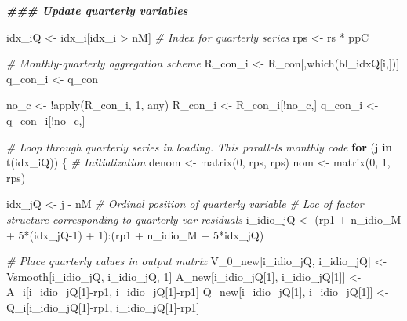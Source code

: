 \documentclass[
]{article}
\newenvironment{Shaded}{\begin{snugshade}}{\end{snugshade}}
\newcommand{\CommentTok}[1]{\textcolor[rgb]{0.56,0.35,0.01}{\textit{#1}}}
\newcommand{\ControlFlowTok}[1]{\textcolor[rgb]{0.13,0.29,0.53}{\textbf{#1}}}
\newcommand{\DecValTok}[1]{\textcolor[rgb]{0.00,0.00,0.81}{#1}}
\newcommand{\DocumentationTok}[1]{\textcolor[rgb]{0.56,0.35,0.01}{\textbf{\textit{#1}}}}
\newcommand{\FunctionTok}[1]{\textcolor[rgb]{0.00,0.00,0.00}{#1}}
\newcommand{\NormalTok}[1]{#1}
\newcommand{\OtherTok}[1]{\textcolor[rgb]{0.56,0.35,0.01}{#1}}
\newcommand{\SpecialCharTok}[1]{\textcolor[rgb]{0.00,0.00,0.00}{#1}}
\begin{document}
\begin{Shaded}
\begin{Highlighting}[]
    \DocumentationTok{\#\#\# Update quarterly variables}
    
\NormalTok{    idx\_iQ }\OtherTok{\textless{}{-}}\NormalTok{ idx\_i[idx\_i }\SpecialCharTok{\textgreater{}}\NormalTok{ nM] }\CommentTok{\# Index for quarterly series}
\NormalTok{    rps }\OtherTok{\textless{}{-}}\NormalTok{ rs }\SpecialCharTok{*}\NormalTok{ ppC}
    
    \CommentTok{\# Monthly{-}quarterly aggregation scheme}
\NormalTok{    R\_con\_i }\OtherTok{\textless{}{-}}\NormalTok{ R\_con[,}\FunctionTok{which}\NormalTok{(bl\_idxQ[i,])]}
\NormalTok{    q\_con\_i }\OtherTok{\textless{}{-}}\NormalTok{ q\_con}
    
\NormalTok{    no\_c }\OtherTok{\textless{}{-}} \SpecialCharTok{!}\FunctionTok{apply}\NormalTok{(R\_con\_i, }\DecValTok{1}\NormalTok{, any)}
\NormalTok{    R\_con\_i }\OtherTok{\textless{}{-}}\NormalTok{ R\_con\_i[}\SpecialCharTok{!}\NormalTok{no\_c,]}
\NormalTok{    q\_con\_i }\OtherTok{\textless{}{-}}\NormalTok{ q\_con\_i[}\SpecialCharTok{!}\NormalTok{no\_c,]}
    
    \CommentTok{\# Loop through quarterly series in loading. This parallels monthly code}
    \ControlFlowTok{for}\NormalTok{ (j }\ControlFlowTok{in} \FunctionTok{t}\NormalTok{(idx\_iQ)) \{}
      \CommentTok{\# Initialization}
\NormalTok{      denom }\OtherTok{\textless{}{-}} \FunctionTok{matrix}\NormalTok{(}\DecValTok{0}\NormalTok{, rps, rps)}
\NormalTok{      nom }\OtherTok{\textless{}{-}} \FunctionTok{matrix}\NormalTok{(}\DecValTok{0}\NormalTok{, }\DecValTok{1}\NormalTok{, rps)}
      
\NormalTok{      idx\_jQ }\OtherTok{\textless{}{-}}\NormalTok{ j }\SpecialCharTok{{-}}\NormalTok{ nM }\CommentTok{\# Ordinal position of quarterly variable}
      \CommentTok{\# Loc of factor structure corresponding to quarterly var residuals}
\NormalTok{      i\_idio\_jQ }\OtherTok{\textless{}{-}}\NormalTok{ (rp1 }\SpecialCharTok{+}\NormalTok{ n\_idio\_M }\SpecialCharTok{+} \DecValTok{5}\SpecialCharTok{*}\NormalTok{(idx\_jQ}\DecValTok{{-}1}\NormalTok{) }\SpecialCharTok{+} \DecValTok{1}\NormalTok{)}\SpecialCharTok{:}\NormalTok{(rp1 }\SpecialCharTok{+}\NormalTok{ n\_idio\_M }\SpecialCharTok{+} \DecValTok{5}\SpecialCharTok{*}\NormalTok{idx\_jQ)}
      
      \CommentTok{\# Place quarterly values in output matrix}
\NormalTok{      V\_0\_new[i\_idio\_jQ, i\_idio\_jQ] }\OtherTok{\textless{}{-}}\NormalTok{ Vsmooth[i\_idio\_jQ, i\_idio\_jQ, }\DecValTok{1}\NormalTok{]}
\NormalTok{      A\_new[i\_idio\_jQ[}\DecValTok{1}\NormalTok{], i\_idio\_jQ[}\DecValTok{1}\NormalTok{]] }\OtherTok{\textless{}{-}}\NormalTok{ A\_i[i\_idio\_jQ[}\DecValTok{1}\NormalTok{]}\SpecialCharTok{{-}}\NormalTok{rp1, i\_idio\_jQ[}\DecValTok{1}\NormalTok{]}\SpecialCharTok{{-}}\NormalTok{rp1]}
\NormalTok{      Q\_new[i\_idio\_jQ[}\DecValTok{1}\NormalTok{], i\_idio\_jQ[}\DecValTok{1}\NormalTok{]] }\OtherTok{\textless{}{-}}\NormalTok{ Q\_i[i\_idio\_jQ[}\DecValTok{1}\NormalTok{]}\SpecialCharTok{{-}}\NormalTok{rp1, i\_idio\_jQ[}\DecValTok{1}\NormalTok{]}\SpecialCharTok{{-}}\NormalTok{rp1]}
      

\end{Highlighting}
\end{Shaded}
\end{document}
